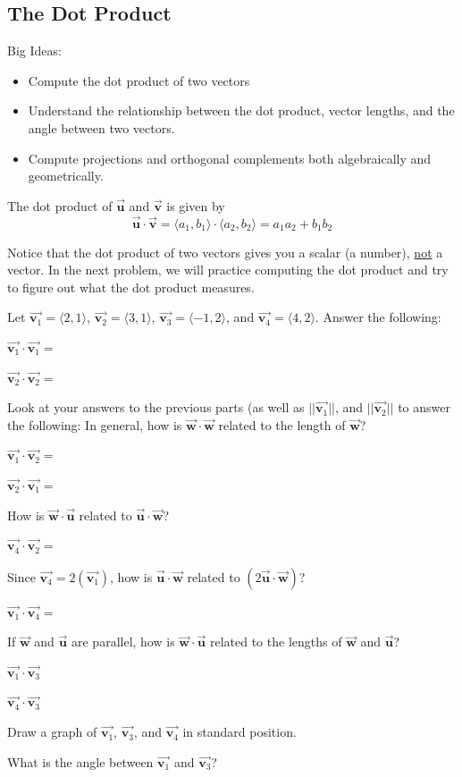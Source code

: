 \subsection{The Dot Product}
Big Ideas:
\begin{itemize}
\item Compute the dot product of two vectors
\item Understand the relationship between the dot product, vector lengths, and the angle between two vectors.
\item Compute projections and orthogonal complements both algebraically and geometrically.
\end{itemize}
\begin{info} The dot product of $\vec{\textbf{u}}$ and $\vec{\textbf{v}}$ is given by $$\vec{\textbf{u}} \cdot \vec{\textbf{v}} =\langle a_1,b_1\rangle \cdot \langle a_2,b_2 \rangle=a_1a_2+b_1b_2$$

Notice that the dot product of two vectors gives you a scalar (a number), \underline{not} a vector. In the next problem, we will practice computing the dot product and try to figure out what the dot product measures. \end{info}

\bq Let $\vec{\textbf{v}_1}=\langle 2,1\rangle$, $\vec{\textbf{v}_2}=\langle 3,1\rangle$, $\vec{\textbf{v}_3}=\langle -1,2\rangle$, and $\vec{\textbf{v}_4}=\langle 4,2\rangle$. Answer the following:
\be
\item $\vec{\textbf{v}_1} \cdot \vec{\textbf{v}_1}=$
\item $\vec{\textbf{v}_2} \cdot \vec{\textbf{v}_2}=$
\item Look at your answers to the previous parts (as well as $||\vec{\textbf{v}_1}||$, and $||\vec{\textbf{v}_2}||$ to answer the following: In general, how is $\vec{\textbf{w}} \cdot \vec{\textbf{w}}$ related to the length of $\vec{\textbf{w}}$?
\item $\vec{\textbf{v}_1} \cdot \vec{\textbf{v}_2}=$
\item $\vec{\textbf{v}_2} \cdot \vec{\textbf{v}_1}=$
\item How is $\vec{\textbf{w}} \cdot \vec{\textbf{u}}$ related to $\vec{\textbf{u}} \cdot \vec{\textbf{w}}$?
\item $\vec{\textbf{v}_4} \cdot \vec{\textbf{v}_2}=$
\item Since $\vec{\textbf{v}_4}= 2 (\vec{\textbf{v}_1})$, how is $\vec{\textbf{u}} \cdot \vec{\textbf{w}}$ related to $(2 \vec{\textbf{u}} \cdot \vec{\textbf{w}})$?
\item $\vec{\textbf{v}_1} \cdot \vec{\textbf{v}_4}=$
\item If $\vec{\textbf{w}}$ and $\vec{\textbf{u}}$ are parallel, how is $\vec{\textbf{w}} \cdot \vec{\textbf{u}}$ related to the lengths of $\vec{\textbf{w}}$ and $\vec{\textbf{u}}$?
\item $\vec{\textbf{v}_1} \cdot \vec{\textbf{v}_3}$
\item $\vec{\textbf{v}_4} \cdot \vec{\textbf{v}_3}$
\item Draw a graph of $\vec{\textbf{v}_1}$, $\vec{\textbf{v}_3}$, and $\vec{\textbf{v}_4}$ in standard position.
\item What is the angle between $\vec{\textbf{v}_1}$ and  $\vec{\textbf{v}_3}$?
\ee
\eq

